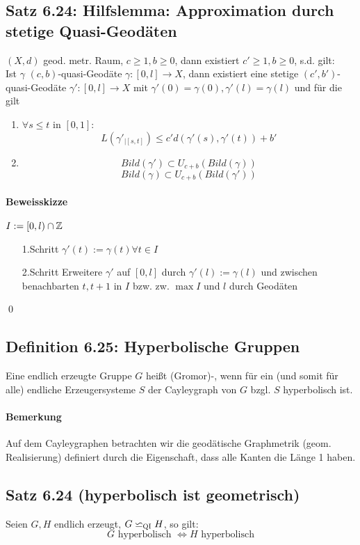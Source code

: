 \documentclass{article}
\newcommand{\qi}{\backsimeq_{\textsc{QI}}}
\begin{document}
\subsection{Satz 6.24: Hilfslemma: Approximation durch stetige Quasi-Geodäten}
$(X,d)$ geod. metr. Raum, $c \geq 1, b \geq 0$, dann existiert $c' \geq 1, b \geq 0$, s.d. gilt:\\
Ist $\gamma$ $(c,b)$-quasi-Geodäte $\gamma : [0,l] \rightarrow X$, dann existiert eine stetige $(c',b')$-quasi-Geodäte $\gamma' : [0,l] \rightarrow X$ mit $\gamma'(0) = \gamma(0), \gamma'(l) = \gamma(l)$ und für die gilt
\begin{enumerate}
	\item $\forall s \leq t $ in $[0,1]$:
	\[L(\gamma'_{|[s,t]}) \leq c'd(\gamma'(s) , \gamma'(t)) + b' \]
	\item 
	\[Bild(\gamma') \subset U_{c+ b}(Bild(\gamma))  \]
	\[Bild(\gamma) \subset U_{c+ b}(Bild(\gamma'))  \]
\end{enumerate}

\paragraph{Beweisskizze}
$I := [0,l) \cap \mathbb{Z}$
\begin{enumerate}
	\item[1.Schritt] $\gamma'(t) := \gamma(t) \forall t \in I$
	\item[2.Schritt] Erweitere $\gamma'$ auf $[0,l]$ durch $\gamma'(l) := \gamma(l)$ und zwischen benachbarten $t,t+1$ in $I$ bzw. zw. $\max I$ und $l$ durch Geodäten
	\end{enumerate}
\qed

\subsection{Definition 6.25: Hyperbolische Gruppen}
Eine endlich erzeugte Gruppe $G$ heißt (Gromor)-, wenn für ein (und somit für alle) endliche Erzeugersysteme $S$ der Cayleygraph von $G$ bzgl. $S$ hyperbolisch ist.

\paragraph{Bemerkung}
Auf dem Cayleygraphen betrachten wir die geodätische Graphmetrik (geom. Realisierung) definiert durch die Eigenschaft, dass alle Kanten die Länge 1 haben.

\subsection{Satz 6.24 (hyperbolisch ist geometrisch)}
Seien $G, H $ endlich erzeugt, $G \qi H$, so gilt:\\
\[G \text{ hyperbolisch } \Leftrightarrow H \text{ hyperbolisch} \]
\end{document}
